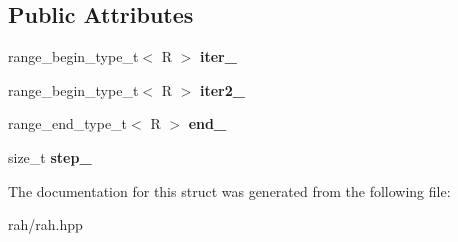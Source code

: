 \subsection*{Public Attributes}
\begin{DoxyCompactItemize}
\item 
\mbox{\label{struct_r_a_h___n_a_m_e_s_p_a_c_e_1_1view_1_1chunk__iterator_a68b188dfca38a6eebd03ce2aee91c33e}} 
range\+\_\+begin\+\_\+type\+\_\+t$<$ R $>$ {\bfseries iter\+\_\+}
\item 
\mbox{\label{struct_r_a_h___n_a_m_e_s_p_a_c_e_1_1view_1_1chunk__iterator_a7fae91da2b31a981b0fd591e138b262e}} 
range\+\_\+begin\+\_\+type\+\_\+t$<$ R $>$ {\bfseries iter2\+\_\+}
\item 
\mbox{\label{struct_r_a_h___n_a_m_e_s_p_a_c_e_1_1view_1_1chunk__iterator_aa0f3f38ab7ce7910a6b6da198cea11ac}} 
range\+\_\+end\+\_\+type\+\_\+t$<$ R $>$ {\bfseries end\+\_\+}
\item 
\mbox{\label{struct_r_a_h___n_a_m_e_s_p_a_c_e_1_1view_1_1chunk__iterator_ad683d795a58877247cac565ba245598c}} 
size\+\_\+t {\bfseries step\+\_\+}
\end{DoxyCompactItemize}


The documentation for this struct was generated from the following file\+:\begin{DoxyCompactItemize}
\item 
rah/rah.\+hpp\end{DoxyCompactItemize}
